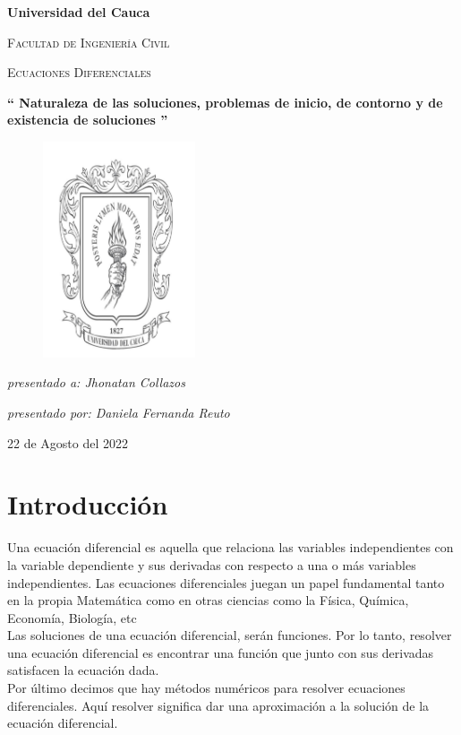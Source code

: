 \documentclass{article}
\begin{document}
\begin{titlepage}
\centering
{\bfseries\LARGE Universidad del Cauca \par}
\vspace{1cm}
{\scshape\Large Facultad de Ingeniería Civil\par}
\vspace{1cm}
{\scshape\Huge Ecuaciones Diferenciales\par}
{\bfseries\LARGE  “ Naturaleza de las soluciones, problemas de inicio, de contorno y de existencia de soluciones ” \par}
\begin{figure}
    \centering
    \includegraphics[width=0.4\textwidth]{logo}
    \label{fig:my_label}
\end{figure}
\vspace{3cm}
{\itshape\Large presentado a: Jhonatan Collazos \par}
\vfill
{\itshape\Large presentado por:  Daniela Fernanda Reuto  \par}
\vfill
{\Large 22 de Agosto del 2022 \par}
\end{titlepage}
\tableofcontents
\newpage
\section{Introducción}
Una ecuación diferencial es aquella que relaciona las variables independientes con la variable dependiente y sus derivadas con respecto a una o más variables independientes. Las ecuaciones diferenciales juegan un papel fundamental tanto en la propia Matemática como en otras ciencias como la Física, Química, Economía, Biología, etc \\
Las soluciones de una ecuación diferencial, serán funciones. Por lo tanto, resolver una ecuación diferencial es encontrar una función que junto con sus derivadas satisfacen la ecuación dada.\\
Por último decimos que hay métodos numéricos para resolver ecuaciones diferenciales. Aquí resolver significa dar una aproximación a la solución de la ecuación diferencial.
\end{document}
